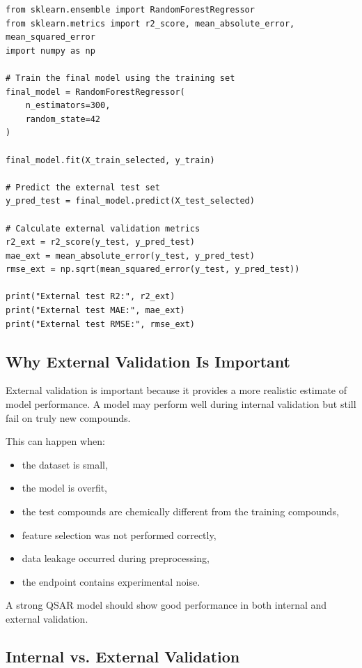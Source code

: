 \documentclass[11pt]{report}
\newenvironment{Important note}{\begin{quote}\color{red}\textbf{Important note:} }{\end{quote}}
\begin{document}
\begin{lstlisting}[style=pythonstyle, caption={Example of external validation after model training.}]
from sklearn.ensemble import RandomForestRegressor
from sklearn.metrics import r2_score, mean_absolute_error, mean_squared_error
import numpy as np

# Train the final model using the training set
final_model = RandomForestRegressor(
    n_estimators=300,
    random_state=42
)

final_model.fit(X_train_selected, y_train)

# Predict the external test set
y_pred_test = final_model.predict(X_test_selected)

# Calculate external validation metrics
r2_ext = r2_score(y_test, y_pred_test)
mae_ext = mean_absolute_error(y_test, y_pred_test)
rmse_ext = np.sqrt(mean_squared_error(y_test, y_pred_test))

print("External test R2:", r2_ext)
print("External test MAE:", mae_ext)
print("External test RMSE:", rmse_ext)
\end{lstlisting}

\subsection{Why External Validation Is Important}

External validation is important because it provides a more realistic estimate of model performance. A model may perform well during internal validation but still fail on truly new compounds.

This can happen when:

\begin{itemize}[leftmargin=*]
    \item the dataset is small,
    \item the model is overfit,
    \item the test compounds are chemically different from the training compounds,
    \item feature selection was not performed correctly,
    \item data leakage occurred during preprocessing,
    \item the endpoint contains experimental noise.
\end{itemize}

A strong QSAR model should show good performance in both internal and external validation.

\subsection{Internal vs. External Validation}
\end{document}
